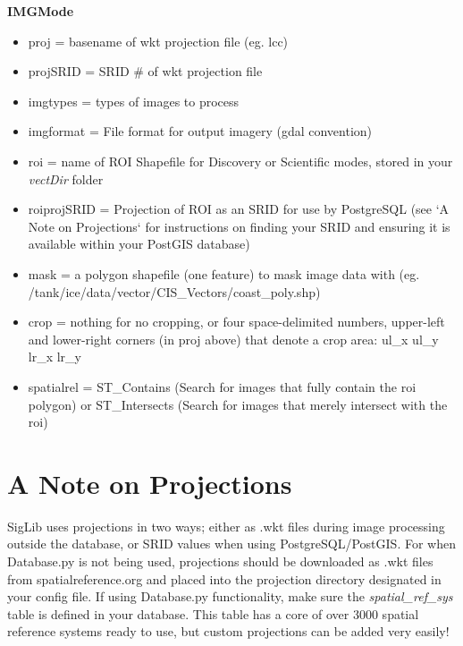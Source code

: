 \documentclass[letterpaper,10pt,openany,oneside]{sphinxmanual}
\begin{document}
\textbf{IMGMode}
\begin{itemize}
\item {} 
proj = basename of wkt projection file (eg. lcc)

\item {} 
projSRID = SRID \# of wkt projection file

\item {} 
imgtypes = types of images to process

\item {} 
imgformat = File format for output imagery (gdal convention)

\item {} 
roi = name of ROI Shapefile for Discovery or Scientific modes, stored
in your \emph{vectDir} folder

\item {} 
roiprojSRID = Projection of ROI as an SRID for use by PostgreSQL (see
`A Note on Projections` for
instructions on finding your SRID and ensuring it is available within
your PostGIS database)

\item {} 
mask = a polygon shapefile (one feature) to mask image data with (eg.
/tank/ice/data/vector/CIS\_Vectors/coast\_poly.shp)

\item {} 
crop = nothing for no cropping, or four space-delimited numbers,
upper-left and lower-right corners (in proj above) that denote a crop
area: ul\_x ul\_y lr\_x lr\_y

\item {} 
spatialrel = ST\_Contains (Search for images that fully contain the
roi polygon) or ST\_Intersects (Search for images that merely
intersect with the roi)

\end{itemize}


\chapter{A Note on Projections}
\label{wiki:a-note-on-projections}
SigLib uses projections in two ways; either as .wkt files during image
processing outside the database, or SRID values when using
PostgreSQL/PostGIS. For when Database.py is not being used, projections
should be downloaded as .wkt files from spatialreference.org and placed
into the projection directory designated in your config file. If using
Database.py functionality, make sure the \emph{spatial\_ref\_sys} table is
defined in your database. This table has a core of over 3000 spatial
reference systems ready to use, but custom projections can be added very
easily!
\end{document}
